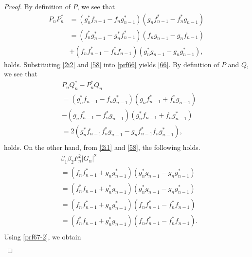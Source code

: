 \documentclass[10pt,leqno]{amsart}
\numberwithin{equation}{section}
\begin{document}
\begin{proof}
By definition of $P$, we see that
\begin{equation}\label{prf66}
\begin{split}
P_{n}P_{n}^{*}&=\left(g_{n}^{*}f_{n-1}-f_{n}g_{n-1}^{*}\right)\left(g_{n}f_{n-1}^{*}-f_{n}^{*}g_{n-1}\right)\\
&=\left(f_{n}^{*}g_{n-1}^{*}-g_{n}^{*}f_{n-1}^{*}\right)\left(f_{n}g_{n-1}-g_{n}f_{n-1}\right)\\
&+\left(f_{n}f_{n-1}^{*}-f_{n}^{*}f_{n-1}\right)\left(g_{n}^{*}g_{n-1}-g_{n}g_{n-1}^{*}\right),
\end{split}
\end{equation}
holds.
Substituting \eqref{2i2} and \eqref{58} into \eqref{prf66} yields \eqref{66}.
By definition of $P$ and $Q$, we see that
\begin{equation}\label{prf67-1}
\begin{split}
&P_{n}Q_{n}^{*}-P_{n}^{*}Q_{n}\\
&=\left(g_{n}^{*}f_{n-1}-f_{n}g_{n-1}^{*}\right)\left(g_{n}f_{n-1}^{*}+f_{n}^{*}g_{n-1}\right)\\
&-\left(g_{n}f_{n-1}^{*}-f_{n}^{*}g_{n-1}\right)\left(g_{n}^{*}f_{n-1}+f_{n}g_{n-1}^{*}\right)\\
&=2\left(g_{n}^{*}f_{n-1}f_{n}^{*}g_{n-1}-g_{n}f_{n-1}^{*}f_{n}g_{n-1}^{*}\right),\\
\end{split}
\end{equation}
holds.
On the other hand, from \eqref{2i1} and \eqref{58}, the following holds.
\begin{equation}\label{prf67-2}
\begin{split}
&\beta_{1}\beta_{2} F_{n}^{2}|G_{n}|^{2}\\
&=\left(f_{n}f_{n-1}^*+g_{n}g_{n-1}^*\right)\left(g_{n}^{*}g_{n-1}-g_{n}g_{n-1}^*\right)\\
&=\left(f_{n}^*f_{n-1}+g_{n}^*g_{n-1}\right)\left(g_{n}^{*}g_{n-1}-g_{n}g_{n-1}^*\right)\\
&=\left(f_{n}f_{n-1}^*+g_{n}g_{n-1}^*\right)\left(f_{n}f_{n-1}^{*}-f_{n}^*f_{n-1}\right)\\
&=\left(f_{n}^*f_{n-1}+g_{n}^*g_{n-1}\right)\left(f_{n}f_{n-1}^{*}-f_{n}^*f_{n-1}\right).\\
\end{split}
\end{equation}
Using \eqref{prf67-2}, we obtain
\begin{equation}\label{prf67-3}
\begin{split}

\end{split}
\end{equation}
\end{proof}
\end{document}
